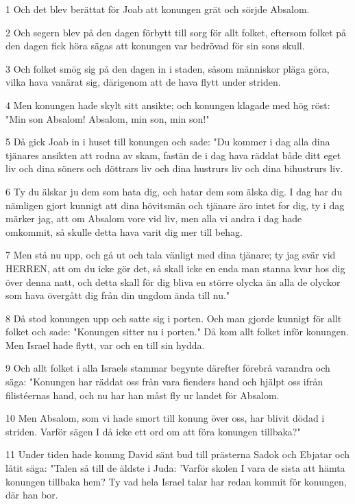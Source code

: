 \par 1 Och det blev berättat för Joab att konungen grät och sörjde Absalom.
\par 2 Och segern blev på den dagen förbytt till sorg för allt folket, eftersom folket på den dagen fick höra sägas att konungen var bedrövad för sin sons skull.
\par 3 Och folket smög sig på den dagen in i staden, såsom människor pläga göra, vilka hava vanärat sig, därigenom att de hava flytt under striden.
\par 4 Men konungen hade skylt sitt ansikte; och konungen klagade med hög röst: "Min son Absalom! Absalom, min son, min son!"
\par 5 Då gick Joab in i huset till konungen och sade: "Du kommer i dag alla dina tjänares ansikten att rodna av skam, fastän de i dag hava räddat både ditt eget liv och dina söners och döttrars liv och dina hustrurs liv och dina bihustrurs liv.
\par 6 Ty du älskar ju dem som hata dig, och hatar dem som älska dig. I dag har du nämligen gjort kunnigt att dina hövitsmän och tjänare äro intet for dig, ty i dag märker jag, att om Absalom vore vid liv, men alla vi andra i dag hade omkommit, så skulle detta hava varit dig mer till behag.
\par 7 Men stå nu upp, och gå ut och tala vänligt med dina tjänare; ty jag svär vid HERREN, att om du icke gör det, så skall icke en enda man stanna kvar hos dig över denna natt, och detta skall för dig bliva en större olycka än alla de olyckor som hava övergått dig från din ungdom ända till nu."
\par 8 Då stod konungen upp och satte sig i porten. Och man gjorde kunnigt för allt folket och sade: "Konungen sitter nu i porten." Då kom allt folket inför konungen. Men Israel hade flytt, var och en till sin hydda.
\par 9 Och allt folket i alla Israels stammar begynte därefter förebrå varandra och säga: "Konungen har räddat oss från vara fienders hand och hjälpt oss ifrån filistéernas hand, och nu har han måst fly ur landet för Absalom.
\par 10 Men Absalom, som vi hade smort till konung över oss, har blivit dödad i striden. Varför sägen I då icke ett ord om att föra konungen tillbaka?"
\par 11 Under tiden hade konung David sänt bud till prästerna Sadok och Ebjatar och låtit säga: "Talen så till de äldste i Juda: 'Varför skolen I vara de sista att hämta konungen tillbaka hem? Ty vad hela Israel talar har redan kommit för konungen, där han bor.
